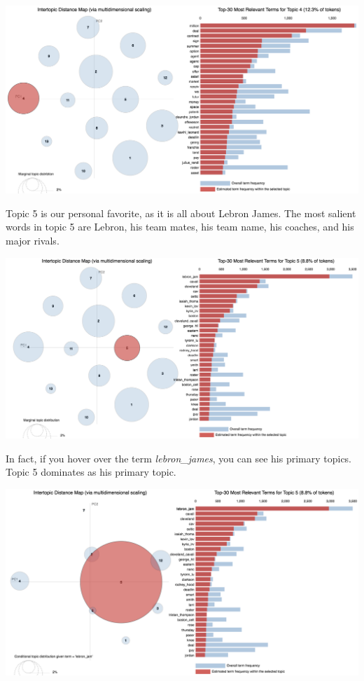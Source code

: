 \documentclass[11pt]{article}
\begin{document}
\includegraphics[width=470pt]{4.png} 

Topic 5 is our personal favorite, as it is all about Lebron James.  The most salient words in topic 5 are Lebron, his team mates, his team name, his coaches, and his major rivals.  

\includegraphics[width=470pt]{5.png} 

In fact, if you hover over the term \textit{lebron\_james}, you can see his primary topics. Topic 5 dominates as his primary topic. 

\includegraphics[width=470pt]{6_lebron.png} 
\end{document}

